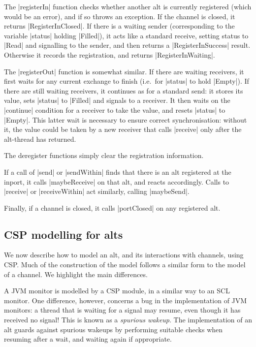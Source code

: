 The |registerIn| function checks whether another alt is currently registered
(which would be an error), and if so throws an exception.  If the channel is
closed, it returns |RegisterInClosed|.  If there is a waiting sender
(corresponding to the variable |status| holding |Filled|), it acts like a
standard receive, setting status to |Read| and signalling to the sender, and
then returns a |RegisterInSuccess| result.  Otherwise it records the
registration, and returns |RegisterInWaiting|.  

The |registerOut| function is somewhat similar.  If there are waiting
receivers, it first waits for any current exchange to finish (i.e.~for
|status| to hold |Empty|).  If there are still waiting receivers, it continues
as for a standard send: it stores its value, sets |status| to |Filled| and
signals to a receiver.  It then waits on the |continue| condition for a
receiver to take the value, and resets |status| to |Empty|.  This latter wait
is necessary to ensure correct synchronisation: without it, the value could be
taken by a new receiver that calls |receive| only after the alt-thread has
returned.  

The deregister functions simply clear the registration information.

If a call of |send| or |sendWithin| finds that there is an alt registered at
the inport, it calls |maybeReceive| on that alt, and reacts accordingly.
Calls to |receive| or |receiveWithin| act similarly, calling |maybeSend|.  

Finally, if a channel is closed, it calls |portClosed| on any registered alt. 


\subsection{CSP modelling for alts}

\inlineCSP

We now describe how to model an alt, and its interactions with channels, using
CSP\@.  Much of the construction of the model follows a similar form to the
model of a channel.  We highlight the main differences. 

A JVM monitor is modelled by a CSP module, in a similar way to an SCL monitor.
One difference, however, concerns a bug in the implementation of JVM monitors:
a thread that is waiting for a signal may resume, even though it has received
no signal!  This is known as a \emph{spurious wakeup}.  The implementation of
an alt guards against spurious wakeups by performing suitable checks when
resuming after a wait, and waiting again if appropriate.  

